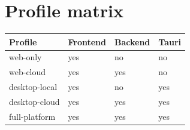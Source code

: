 \section{Profile matrix}
\label{app:profile-matrix}

\begin{tabularx}{\textwidth}{@{}lXXX@{}}
\toprule
Profile & Frontend & Backend & Tauri \\
\midrule
web-only & yes & no & no \\
web-cloud & yes & yes & no \\
desktop-local & yes & no & yes \\
desktop-cloud & yes & yes & yes \\
full-platform & yes & yes & yes \\
\bottomrule
\end{tabularx}
